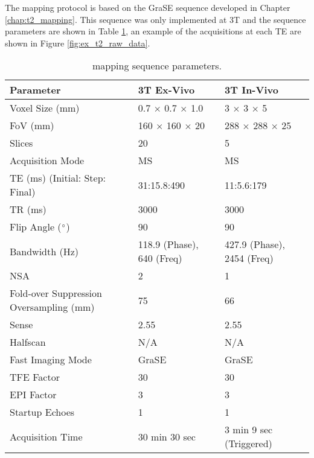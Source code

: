 The \ttwo mapping protocol is based on the \ac{GraSE} sequence developed in Chapter \ref{chap:t2_mapping}. This sequence was only implemented at 3T and the sequence parameters are shown in Table \ref{tab:ex_t2_mapping}, an example of the acquisitions at each \ac{TE} are shown in Figure \ref{fig:ex_t2_raw_data}. 

\begin{table}[H]
	\centering
	\begin{tabularx}{1.0\textwidth}{X|X|X}
	\textbf{Parameter}                      & \textbf{3T Ex-Vivo} & \textbf{3T In-Vivo} \\ \hline
	Voxel Size (mm)                         & 0.7 $\times$ 0.7 $\times$ 1.0     & 3 $\times$ 3 $\times$ 5           \\ \hline
	FoV (mm)                                & 160 $\times$ 160 $\times$ 20      & 288 $\times$ 288 $\times$ 25      \\ \hline
	Slices                                  & 20                  & 5                   \\ \hline
	Acquisition Mode                        & MS                  & MS                  \\ \hline
	TE (ms) (Initial: Step: Final)          & 31:15.8:490         & 11:5.6:179          \\ \hline
	TR (ms)                                 & 3000                & 3000                \\ \hline
	Flip Angle ($\degree$)                  & 90                  & 90                  \\ \hline
	Bandwidth (Hz)                          & 118.9 (Phase), 640 (Freq) & 427.9 (Phase), 2454 (Freq)              \\ \hline
	NSA                                     & 2                   & 1                   \\ \hline
	Fold-over Suppression Oversampling (mm) & 75                  & 66                  \\ \hline
	Sense                                   & 2.55                & 2.55                \\ \hline
	Halfscan                                & N/A                 & N/A                 \\ \hline
	Fast Imaging Mode                       & GraSE               & GraSE               \\ \hline
	TFE Factor                              & 30                  & 30                  \\ \hline
	EPI Factor                              & 3                   & 3                   \\ \hline
	Startup Echoes                          & 1                   & 1                   \\ \hline
	Acquisition Time                        & 30 min 30 sec       & 3 min 9 sec (Triggered) 
	\end{tabularx}
	\caption{\ttwo mapping sequence parameters.}
	\label{tab:ex_t2_mapping}
\end{table}

